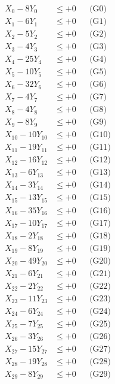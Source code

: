 \documentclass[a4paper,10pt]{article}
\begin{document}
\allowdisplaybreaks
{\small
\begin{align}
\allowbreak
X_{0} - 8Y_{0} &\leq +0 && \text{(G0)} \\
X_{1} - 6Y_{1} &\leq +0 && \text{(G1)} \\
X_{2} - 5Y_{2} &\leq +0 && \text{(G2)} \\
X_{3} - 4Y_{3} &\leq +0 && \text{(G3)} \\
\allowbreak
X_{4} - 25Y_{4} &\leq +0 && \text{(G4)} \\
X_{5} - 10Y_{5} &\leq +0 && \text{(G5)} \\
X_{6} - 32Y_{6} &\leq +0 && \text{(G6)} \\
X_{7} - 4Y_{7} &\leq +0 && \text{(G7)} \\
X_{8} - 4Y_{8} &\leq +0 && \text{(G8)} \\
X_{9} - 8Y_{9} &\leq +0 && \text{(G9)} \\
X_{10} - 10Y_{10} &\leq +0 && \text{(G10)} \\
X_{11} - 19Y_{11} &\leq +0 && \text{(G11)} \\
X_{12} - 16Y_{12} &\leq +0 && \text{(G12)} \\
X_{13} - 6Y_{13} &\leq +0 && \text{(G13)} \\
\allowbreak
X_{14} - 3Y_{14} &\leq +0 && \text{(G14)} \\
X_{15} - 13Y_{15} &\leq +0 && \text{(G15)} \\
X_{16} - 35Y_{16} &\leq +0 && \text{(G16)} \\
X_{17} - 10Y_{17} &\leq +0 && \text{(G17)} \\
X_{18} - 2Y_{18} &\leq +0 && \text{(G18)} \\
X_{19} - 8Y_{19} &\leq +0 && \text{(G19)} \\
X_{20} - 49Y_{20} &\leq +0 && \text{(G20)} \\
X_{21} - 6Y_{21} &\leq +0 && \text{(G21)} \\
X_{22} - 2Y_{22} &\leq +0 && \text{(G22)} \\
X_{23} - 11Y_{23} &\leq +0 && \text{(G23)} \\
\allowbreak
X_{24} - 6Y_{24} &\leq +0 && \text{(G24)} \\
X_{25} - 7Y_{25} &\leq +0 && \text{(G25)} \\
X_{26} - 3Y_{26} &\leq +0 && \text{(G26)} \\
X_{27} - 15Y_{27} &\leq +0 && \text{(G27)} \\
X_{28} - 19Y_{28} &\leq +0 && \text{(G28)} \\
X_{29} - 8Y_{29} &\leq +0 && \text{(G29)} \\

\end{align}}
\end{document}
